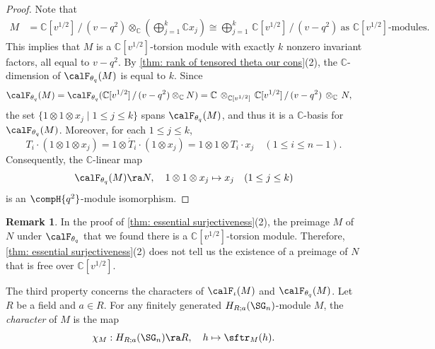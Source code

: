 \documentclass[12pt, reqno]{amsart}
\theoremstyle{plain}
\theoremstyle{definition}
\newtheorem{remark}[remark]{Remark}
\numberwithin{equation}{section}
\numberwithin{figure}{section}
\numberwithin{table}{section}
\def\C{\mathbb C}
\begin{document}
\begin{proof}
Note that
\begin{align*}
M & =  \C[v^{1/2}] \, / \, (v-q^2)  \otimes_{\C}  \left( \bigoplus_{j=1}^k \C x_j \right)
\cong \bigoplus_{j=1}^k \, \C[v^{1/2}] \, / \, (v-q^2)  \  \text{as $\C[v^{1/2}]$-modules.}
\end{align*}
This implies that $M$ is a $\C[v^{1/2}]$-torsion module with exactly $k$ nonzero invariant factors, all equal to $v-q^2$.
By \cref{thm: rank of tensored theta our cons}(2), the $\C$-dimension of $\calF_{\theta_q}(M)$ is equal to $k$.
Since
\begin{align*}
\calF_{\theta_q}(M)
& = \calF_{\theta_q}(\C[v^{1/2}] \, / \, (v - q^2) \otimes_{\C} N) 
= \C \, \otimes_{\C[v^{1/2}]} \, \C[v^{1/2}] \, / \, (v - q^2)\, \otimes_{\C} \, N,
\end{align*}
the set $\{1 \otimes 1 \otimes x_j \mid 1 \le j \le k\}$ spans $\calF_{\theta_q}(M)$, and thus it is a $\C$-basis for $\calF_{\theta_q}(M)$.
Moreover, for each $1\le j \le k$,
\[
T_i \cdot (1 \otimes 1 \otimes x_j)
= 1 \otimes \mathring{T}_i \cdot (1 \otimes x_j)
= 1 \otimes 1 \otimes T_i \cdot x_j \quad (1 \le i \le n-1).
\]
Consequently, the $\C$-linear map
\[
\calF_{\theta_q}(M) \ra N, \quad 1 \otimes 1 \otimes x_j \mapsto x_j  \quad (1 \le j \le k)
\]
is an $\compH{q^2}$-module isomorphism.
\end{proof}







\begin{remark}
In the proof of \cref{thm: essential surjectiveness}(2), the preimage $M$ of $N$ under $\calF_{\theta_q}$ that we found there is a $\C[v^{1/2}]$-torsion module.
Therefore,  \cref{thm: essential surjectiveness}(2) does not tell us the existence of a preimage of $N$ that is free over $\C[v^{1/2}]$.
\end{remark}



    



The third property  concerns the characters of $\calF_\iota(M)$ and $\calF_{\theta_q}(M)$. 
Let $R$ be a field and $a \in R$.
For any finitely generated $H_{R;a}(\SG_n)$-module $M$, the \emph{character} of $M$ is the map
\[
\chi_M : H_{R;a}(\SG_n) \ra R, \quad h \mapsto \sftr_{M}(h).
\]
\end{document}
